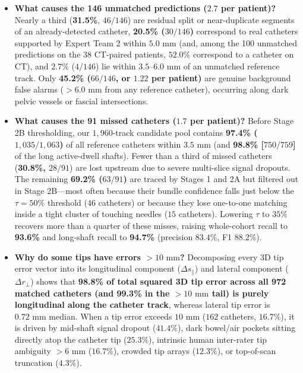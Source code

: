 \documentclass[
  11pt,
]{article}
\providecommand{\tightlist}{%
  \setlength{\itemsep}{0pt}\setlength{\parskip}{0pt}}
\begin{document}
\begin{itemize}
\tightlist
\item
  \textbf{What causes the 146 unmatched predictions (\(2.7\) per
  patient)?} Nearly a third (\textbf{31.5\%}, \(46/146\)) are residual
  split or near-duplicate segments of an already-detected catheter,
  \textbf{20.5\% (\(30/146\))} correspond to real catheters supported by
  Expert Team 2 within \(5.0\text{ mm}\) (and, among the 100 unmatched
  predictions on the 38 CT-paired patients, \(52.0\%\) correspond to a
  catheter on CT), and \(2.7\%\) (\(4/146\)) lie within
  \(3.5\text{--}6.0\text{ mm}\) of an unmatched reference track. Only
  \textbf{45.2\% (\(66/146\), or \(1.22\) per patient)} are genuine
  background false alarms (\(>6.0\text{ mm}\) from any reference
  catheter), occurring along dark pelvic vessels or fascial
  intersections.
\item
  \textbf{What causes the 91 missed catheters (\(1.7\) per patient)?}
  Before Stage 2B thresholding, our \(1,960\)-track candidate pool
  contains \textbf{97.4\% (\(1,035/1,063\))} of all reference catheters
  within \(3.5\text{ mm}\) (and \textbf{98.8\% {[}\(750/759\){]}} of the
  long active-dwell shafts). Fewer than a third of missed catheters
  (\textbf{30.8\%, \(28/91\)}) are lost upstream due to severe
  multi-slice signal dropouts. The remaining \textbf{69.2\% (\(63/91\))}
  are traced by Stages 1 and 2A but filtered out in Stage 2B---most
  often because their bundle confidence falls just below the
  \(\tau = 50\%\) threshold (\(46\) catheters) or because they lose
  one-to-one matching inside a tight cluster of touching needles (\(15\)
  catheters). Lowering \(\tau\) to \(35\%\) recovers more than a quarter
  of these misses, raising whole-cohort recall to \textbf{93.6\%} and
  long-shaft recall to \textbf{94.7\%} (precision \(83.4\%\), F1
  \(88.2\%\)).
\item
  \textbf{Why do some tips have errors \(> 10\text{ mm}\)?} Decomposing
  every 3D tip error vector into its longitudinal component
  (\(\Delta s_\parallel\)) and lateral component (\(\Delta r_\perp\))
  shows that \textbf{98.8\% of total squared 3D tip error across all 972
  matched catheters (and 99.3\% in the \(>10\text{ mm}\) tail) is purely
  longitudinal along the catheter track}, whereas lateral tip error is
  \(0.72\text{ mm}\) median. When a tip error exceeds \(10\text{ mm}\)
  (\(162\) catheters, \(16.7\%\)), it is driven by mid-shaft signal
  dropout (\(41.4\%\)), dark bowel/air pockets sitting directly atop the
  catheter tip (\(25.3\%\)), intrinsic human inter-rater tip ambiguity
  \(>6\text{ mm}\) (\(16.7\%\)), crowded tip arrays (\(12.3\%\)), or
  top-of-scan truncation (\(4.3\%\)).
\end{itemize}
\end{document}
